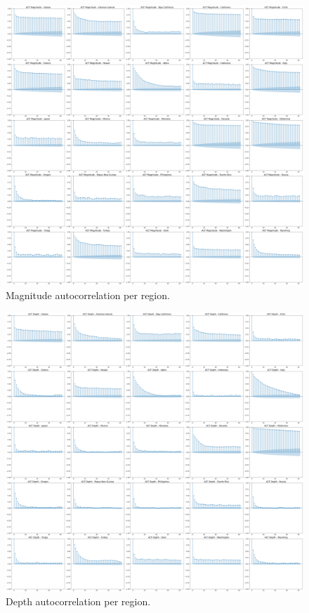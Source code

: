\begin{figure}[hbtp]
    \centering
    \includegraphics[scale=0.15]{img/magnitude-acf-per-region.png}
    \captionsetup{format=hang}
    \caption{\label{fig:mag-acf}Magnitude autocorrelation per region.}
\end{figure}

\begin{figure}[hbtp]
    \centering
    \includegraphics[scale=0.15]{img/depth-acf-per-region.png}
    \captionsetup{format=hang}
    \caption{\label{fig:depth-acf}Depth autocorrelation per region.}
\end{figure}

